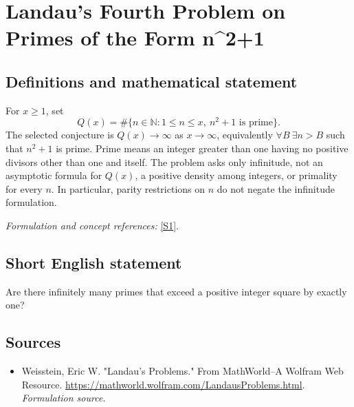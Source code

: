 \documentclass[11pt]{article}
\begin{document}
\section*{\texorpdfstring{Landau's Fourth Problem on Primes of the Form n\textasciicircum{}2+1}{Landau's Fourth Problem on Primes of the Form n\textasciicircum{}2+1}}\label{190}
\subsection{Definitions and mathematical statement}
For $x\ge1$, set
\[
 Q(x)=\#\{n\in{\mathbb{N}}:1\le n\le x,\ n^2+1\text{ is prime}\}.
\]
The selected conjecture is $Q(x)\to\infty$ as $x\to\infty$, equivalently
$\forall B\ \exists n>B$ such that $n^2+1$ is prime. Prime means an integer greater than one having no positive divisors other than one and itself. The problem asks only infinitude, not an asymptotic formula for $Q(x)$, a positive density among integers, or primality for every $n$. In particular, parity restrictions on $n$ do not negate the infinitude formulation.
\par\smallskip\textit{Formulation and concept references:} \href{https://mathworld.wolfram.com/LandausProblems.html}{[S1]}.

\subsection{Short English statement}
Are there infinitely many primes that exceed a positive integer square by exactly one?
\subsection{Sources}
\begin{itemize}
\item[S1]Weisstein, Eric W. "Landau's Problems." From MathWorld--A Wolfram Web Resource.
\url{https://mathworld.wolfram.com/LandausProblems.html}.
\textit{Formulation source.}
\end{itemize}
\end{document}
